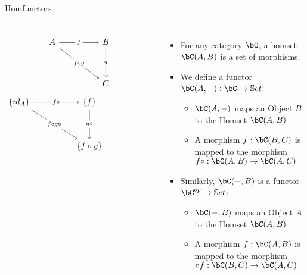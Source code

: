 \begin{frame}[fragile]{Homfunctors}
\begin{columns}
\[\begin{tikzcd}
	A && B \\
	\\
	&& C
	\arrow["f"{description}, from=1-1, to=1-3]
	\arrow["{f \circ g}"{description}, from=1-1, to=3-3]
	\arrow["g"{description}, from=1-3, to=3-3]
\end{tikzcd}\]
\[\begin{tikzcd}
	{\{id_A\}} && {\{f\}} && {} \\
	\\
	&& {\{f \circ g\}}
	\arrow["{f \circ}"{description}, from=1-1, to=1-3]
	\arrow["{f \circ g \circ}"{description}, from=1-1, to=3-3]
	\arrow["{g \circ}"{description}, from=1-3, to=3-3]
\end{tikzcd}\]
 \begin{itemize}
  \item For any category $\bC$, a homset $\bC(A,B)$ is a set of morphisms.
  \pause\item We define a functor $\bC(A, -) : \bC \to \mathbb{S}et$:
  \begin{itemize}
    \pause\item $\bC(A, -)$ maps an Object $B$ to the Homset $\bC(A,B)$
    \pause\item A morphism $f : \bC(B,C)$ is mapped to the morphism $f \circ : \bC(A,B) \to \bC(A,C)$
  \end{itemize}
  \pause\item Similarly, $\bC(-, B)$ is a functor $\bC^{op} \to \mathbb{S}et$:
  \begin{itemize}
    \pause\item $\bC(-, B)$ maps an Object $A$ to the Homset $\bC(A,B)$
    \pause\item A morphism $f : \bC(A,B)$ is mapped to the morphism $\circ f: \bC(B,C) \to \bC(A,C)$
  \end{itemize}
 \end{itemize}
 \end{columns}
\end{frame}
